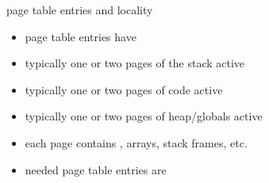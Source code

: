 \begin{frame}{page table entries and locality}
    \begin{itemize}
    \item page table entries have 
    \item typically one or two pages of the stack active
    \item typically one or two pages of code active
    \item typically one or two pages of heap/globals active
    \vspace{.5cm}
    \item each page contains , arrays, stack frames, etc.
    \vspace{.5cm}
    \item<2-> needed page table entries are 
    \end{itemize}
\end{frame}

